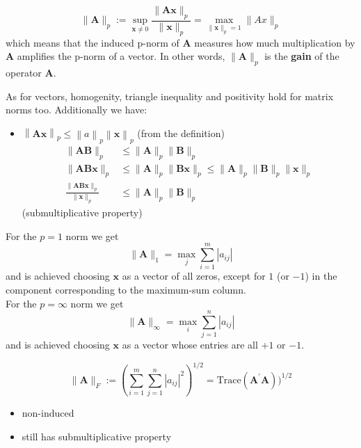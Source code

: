 \begin{equation*}
    \|\mathbf{A}\|_p:=\sup_{\mathbf{x}\neq0}\frac{\|\mathbf{Ax}\|_p}{\|\mathbf{x}\|_p}=\max_{\|\mathbf{x}\|_p=1}\|Ax\|_p
\end{equation*}
which means that the induced p-norm of $\mathbf{A}$ measures how much multiplication by $\mathbf{A}$ amplifies the p-norm of a vector. In other words, $\|\mathbf{A}\|_p$ is the \textbf{gain} of the operator $\mathbf{A}$.



As for vectors, homogenity, triangle inequality and positivity hold for matrix norms too. Additionally we have:
\begin{itemize}
    \item $\left\|\mathbf{Ax}\right\|_p\leq\left\|a\right\|_p\left\|\mathbf{x}\right\|_p$ (from the definition)
          \begin{align*}
              \|\mathbf{AB}\|_p                                     & \leq\|\mathbf{A}\|_p\|\mathbf{B}\|_p                                                      \\
              \|\mathbf{AB} \mathbf{x}\|_p                          & \leq\|\mathbf{A}\|_p\|\mathbf{Bx}\|_p\leq\|\mathbf{A}\|_p\|\mathbf{B}\|_p\|\mathbf{x}\|_p \\
              \frac{\|\mathbf{AB} \mathbf{x}\|_p}{\|\mathbf{x}\|_p} & \leq\|\mathbf{A}\|_p\|\mathbf{B}\|_p
          \end{align*} (submultiplicative property)
\end{itemize}


For the $p = 1$ norm we get
\begin{equation*}
    \|\mathbf{A}\|_1=\max_j\sum_{i=1}^m|a_{ij}|
\end{equation*}
and is achieved choosing $\mathbf{x}$ as a vector of all zeros, except for $1$ (or $-1$) in the component corresponding to the maximum-sum column.\\

For the $p = \infty$ norm we get
\begin{equation*}
    \|\mathbf{A}\|_\infty=\max_i\sum_{j=1}^n|a_{ij}|
\end{equation*}
and is achieved choosing $\mathbf{x}$ as a vector whose entries are all $+1$ or $-1$.


\begin{equation*}
    \|\mathbf{A}\|_F:=\left(\sum_{i=1}^m\sum_{j=1}^n|a_{ij}|^2\right)^{1/2}=\text{Trace}(\mathbf{A}^{\prime}\mathbf{A}))^{1/2}
\end{equation*}

\begin{itemize}
    \item non-induced
    \item still has submultiplicative property
\end{itemize}
